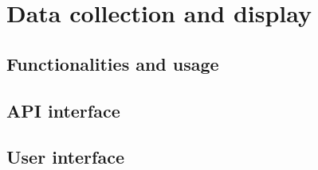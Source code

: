\chapter{Data collection and display}
\label{chap:display}

\section{Functionalities and usage}
\section{API interface}
\section{User interface}